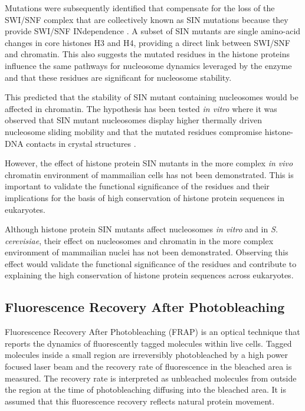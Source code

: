     Mutations were subsequently identified that compensate for the
    loss of the SWI/SNF complex that are collectively known as SIN
    mutations because they provide SWI/SNF INdependence
    .  A subset of SIN mutants are single
    amino-acid changes in core histones H3 and H4, providing a direct
    link between SWI/SNF and chromatin.  This also suggests the
    mutated residues in the histone proteins influence the same
    pathways for nucleosome dynamics leveraged by the enzyme and that
    these residues are significant for nucleosome stability.

    This predicted that the stability of SIN mutant containing
    nucleosomes would be affected in chromatin.
    The hypothesis has been tested \textit{in vitro}
    where it was observed that SIN mutant nucleosomes display higher 
    thermally driven nucleosome sliding mobility \citep{flaus2004sin}
    and that the mutated residues compromise histone-DNA contacts in
    crystal structures \citep{muthurajan2004crystal}.

    However, the effect of histone protein SIN mutants
    in the more complex \textit{in vivo} chromatin environment 
    of mammailian cells has not been demonstrated. This is important to
    validate the functional significance of the residues
    and their implications for the basis of high conservation of 
    histone protein sequences in eukaryotes.

    Although histone protein SIN mutants affect nucleosomes \textit{in
      vitro} and in \textit{S. cerevisiae}, their effect on
    nucleosomes and chromatin in the more complex environment of
    mammailian nuclei has not been demonstrated.  Observing this
    effect would validate the functional significance of the residues
    and contribute to explaining the high conservation of histone
    protein sequences across eukaryotes.

  \subsection{Fluorescence Recovery After Photobleaching}

    Fluorescence Recovery After Photobleaching (FRAP) is an optical technique
    that reports the dynamics of fluorescently tagged molecules within live cells.
    Tagged molecules inside a small region are irreversibly photobleached by
    a high power focused laser beam and the recovery rate of fluorescence
    in the bleached area is measured. The recovery rate is interpreted as unbleached molecules
    from outside the region at the time of photobleaching diffusing into the bleached area.
    It is assumed that this fluorescence recovery reflects natural protein movement.


